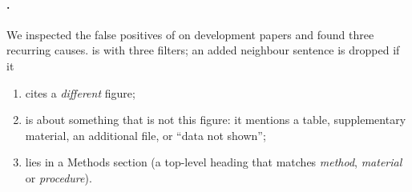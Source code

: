 \paragraph{\bof{}.} We inspected the false positives of \bz{} on development papers and found three recurring
causes. \bof{} is \bz{} with three filters; an added neighbour sentence is dropped if it
\begin{enumerate}
  \item cites a \emph{different} figure;
  \item is about something that is not this figure: it mentions a table, supplementary material, an additional
        file, or ``data not shown'';
  \item lies in a Methods section (a top-level heading that matches \emph{method}, \emph{material} or
        \emph{procedure}).
\end{enumerate}

